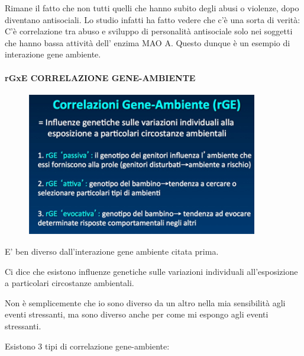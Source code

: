 Rimane il fatto che non tutti quelli che hanno subito degli abusi o
violenze, dopo diventano antisociali. Lo studio infatti ha fatto vedere
che c'è una sorta di verità: C'è correlazione tra abuso e sviluppo di
personalità antisociale solo nei soggetti che hanno bassa attività dell'
enzima MAO A. Questo dunque è un esempio di interazione gene ambiente.

\paragraph{rGxE CORRELAZIONE GENE-AMBIENTE}

\begin{figure}[!ht]
\centering
	\includegraphics[width=0.9\textwidth]{011/image6.png}
\end{figure}

E'
ben diverso dall'interazione gene ambiente citata prima.

Ci dice che esistono influenze genetiche sulle variazioni individuali
all'esposizione a particolari circostanze ambientali.

Non è semplicemente che io sono diverso da un altro nella mia
sensibilità agli eventi stressanti, ma sono diverso anche per come mi
espongo agli eventi stressanti.

Esistono 3 tipi di correlazione gene-ambiente:


